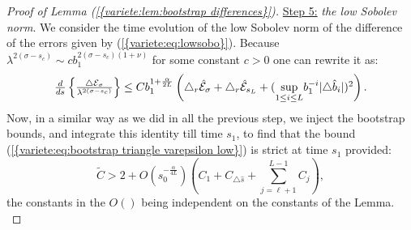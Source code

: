 \documentclass[11pt,a4paper,reqno]{amsart}
\theoremstyle{remark}
\numberwithin{equation}{section}
\begin{document}
\begin{proof}[Proof of Lemma {{\rm (\ref{{variete:lem:bootstrap differences}})}}]
\underline{Step 5:}  \emph{the low Sobolev norm}. We consider the time evolution of the low Sobolev norm of the difference of the errors given by {{\rm (\ref{{variete:eq:lowsobo}})}}. Because $\lambda^{2(\sigma-s_c)}\sim c b_1^{2(\sigma-s_c)(1+\nu)}$ for some constant $c>0$ one can rewrite it as:
$$
\begin{array}{r c l}
\frac{d}{ds}\left\{ \frac{\triangle \mathcal{E}_{\sigma}}{\lambda^{2(\sigma-s_c)}} \right\} \leq Cb_1^{1+\frac{\alpha}{2L}} \left( \triangle_r \hat{\mathcal{E}}_{\sigma}+\triangle _r \hat{\mathcal{E}}_{s_L}+ (\underset{1\leq i \leq L}{\text{sup}}b_1^{-i}|\triangle \hat{b}_i|)^2\right).
\end{array}
$$
Now, in a similar way as we did in all the previous step, we inject the bootstrap bounds, and integrate this identity till time $s_1$, to find that the bound {{\rm (\ref{{variete:eq:bootstrap triangle varepsilon low}})}} is strict at time $s_1$ provided:
\begin{equation} \label{variete:bootstrap:condition mathcalEsigma}
\tilde{C}>2+O(s_0^{-\frac{\alpha}{4L}})(C_1+C_{\triangle \hat{s}}+\sum_{j=\ell+1}^{L-1} C_j), 
\end{equation}
the constants in the $O()$ being independent on the constants of the Lemma.\\


\end{proof}
\end{document}
